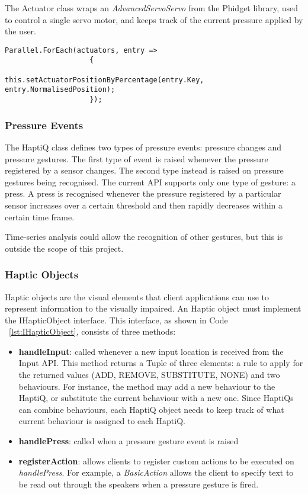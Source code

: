 The Actuator class wraps an \textit{AdvancedServoServo} from the Phidget library, used to control a single servo motor, and keeps track of the current pressure applied by the user. 

\lstset{style=sharpc1}
\begin{lstlisting}[caption={Parallelising Actuators},label={lst:parallelActuators}]
Parallel.ForEach(actuators, entry => 
                    {
                        this.setActuatorPositionByPercentage(entry.Key, entry.NormalisedPosition);
                    });
\end{lstlisting}

\subsubsection{Pressure Events}

The HaptiQ class defines two types of pressure events: pressure changes and pressure gestures. The first type of event is raised whenever the pressure registered by a sensor changes. The second type instead is raised on pressure gestures being recognised. The current API supports only one type of gesture: a press. A press is recognised whenever the pressure registered by a particular sensor increases over a certain threshold and then rapidly decreases within a certain time frame. 

Time-series analysis could allow the recognition of other gestures, but this is outside the scope of this project.



\subsubsection{Haptic Objects}

Haptic objects are the visual elements that client applications can use to represent information to the visually impaired. An Haptic object must implement the IHapticObject interface. This interface, as shown in Code ~\ref{lst:IHapticObject}, consists of three methods:

\begin{itemize}
	\item \textbf{handleInput}: called whenever a new input location is received from the Input API. This method returns a Tuple of three elements: a rule to apply for the returned values (ADD, REMOVE, SUBSTITUTE, NONE) and two behaviours. For instance, the method may add a new behaviour to the HaptiQ, or substitute the current behaviour with a new one. Since HaptiQs can combine behaviours, each HaptiQ object needs to keep track of what current behaviour is assigned to each HaptiQ. 
    \item \textbf{handlePress}: called when a pressure gesture event is raised
    \item \textbf{registerAction}: allows clients to register custom actions to be executed on \textit{handlePress}. For example, a \textit{BasicAction} allows the client to specify text to be read out through the speakers when a pressure gesture is fired.
\end{itemize}


